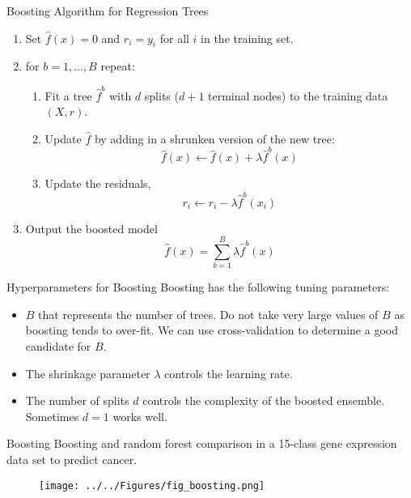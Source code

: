 \documentclass{beamer}
\begin{document}
\begin{frame}{Boosting Algorithm for Regression Trees}
	\begin{enumerate}
		\item Set $\hat{f}(x)=0$ and $r_i=y_i$ for all $i$ in the training set. 
		\item for $b=1,\ldots, B$ repeat:
		\begin{enumerate}
			\item Fit a tree $\hat{f}^b$ with $d$ splits ($d+1$ terminal nodes) to the training data $(X,r)$.
			\item Update $\hat{f}$ by adding in a shrunken version of the new tree:
			\begin{equation*}
				\hat{f}(x) \leftarrow \hat{f}(x)+ \lambda \hat{f}^b (x)
			\end{equation*}
		\item Update the residuals,
		\begin{equation*}
			r_i \leftarrow r_i - \lambda \hat{f}^b(x_i)
		\end{equation*}
		\end{enumerate}
	\item Output the boosted model
	\begin{equation}
		\hat{f}(x)=\sum_{b=1}^B \lambda \hat{f}^b(x)
	\end{equation}
	\end{enumerate}
\end{frame}

\begin{frame}{Hyperparameters for Boosting}
	Boosting has the following tuning parameters:
	
	\begin{itemize}
		\item $B$ that represents the number of trees. Do not take very large values of $B$ as boosting tends to over-fit. We can use cross-validation to determine a good candidate for $B$.
		\item The shrinkage parameter $\lambda$ controls the learning rate. 
		\item The number of splits $d$ controls the complexity of the boosted ensemble. Sometimes $d=1$ works well. 
	\end{itemize}
\end{frame}


\begin{frame}{Boosting}
	Boosting and random forest comparison in a 15-class gene expression data set to predict cancer.
	 \begin{figure}[h]
		\centering
		\texttt{[image: ../../Figures/fig\_boosting.png]}
	\end{figure}
	
\end{frame}
\end{document}
